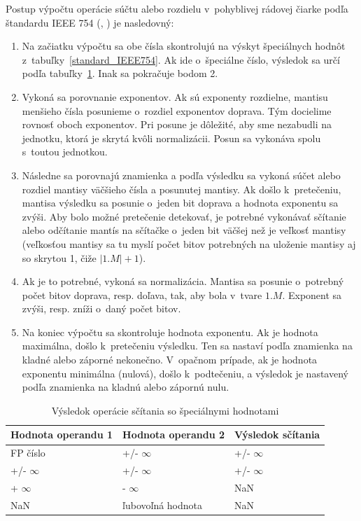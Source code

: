 Postup výpočtu operácie súčtu alebo rozdielu v~pohyblivej rádovej čiarke podľa štandardu IEEE 754 (\cite{FPOnline_operacie}, \cite{CamborBP}) je nasledovný:

\begin{enumerate}  
\item Na začiatku výpočtu sa obe čísla skontrolujú na výskyt špeciálnych hodnôt z~tabuľky~\ref{standard_IEEE754}. Ak ide o~špeciálne číslo, výsledok sa určí podľa tabuľky~\ref{special_plus}. Inak sa pokračuje bodom 2.

\item Vykoná sa porovnanie exponentov. Ak sú exponenty rozdielne, mantisu menšieho čísla posunieme o~rozdiel exponentov doprava. Tým docielime rovnosť oboch exponentov. Pri posune je dôležité, aby sme nezabudli na jednotku, ktorá je skrytá kvôli normalizácii. Posun sa vykonáva spolu s~toutou jednotkou. 

\item Následne sa porovnajú znamienka a podľa výsledku sa vykoná súčet alebo rozdiel mantisy väčšieho čísla a posunutej mantisy. Ak došlo k~pretečeniu, mantisa výsledku sa posunie o~jeden bit doprava a hodnota exponentu sa zvýši. Aby bolo možné pretečenie detekovať, je potrebné vykonávať sčítanie alebo odčítanie mantís na sčítačke o~jeden bit väčšej než je veľkosť mantisy (veľkosťou mantisy sa tu myslí počet bitov potrebných na uloženie mantisy aj so skrytou 1, čiže $ |1.M| + 1 $).

\item Ak je to potrebné, vykoná sa normalizácia. Mantisa sa posunie o~potrebný počet bitov doprava, resp. doľava, tak, aby bola v~tvare $ 1.M $. Exponent sa zvýši, resp. zníži o~daný počet bitov.

\item Na koniec výpočtu sa skontroluje hodnota exponentu. Ak je hodnota maximálna, došlo k~pretečeniu výsledku. Ten sa nastaví podľa znamienka na kladné alebo záporné nekonečno. V~opačnom prípade, ak je hodnota exponentu minimálna (nulová), došlo k~podtečeniu, a výsledok je nastavený podľa znamienka na kladnú alebo zápornú nulu.
\end{enumerate}


\begin{table}[h]
\centering
\begin{tabular}{|l|l|l|}
\hline
\rowcolor[HTML]{68CBD0} 
Hodnota operandu 1 & Hodnota operandu 2 & Výsledok sčítania \\ \hline
FP číslo           & +/- $ \infty $     & +/- $ \infty $    \\ \hline
+/- $ \infty $     & +/- $ \infty $     & +/- $ \infty $    \\ \hline
+ $ \infty $       & - $ \infty $       & NaN               \\ \hline
NaN                & ľubovoľná hodnota  & NaN               \\ \hline
\end{tabular}
\caption{Výsledok operácie sčítania so špeciálnymi hodnotami}
\label{special_plus}
\end{table}

